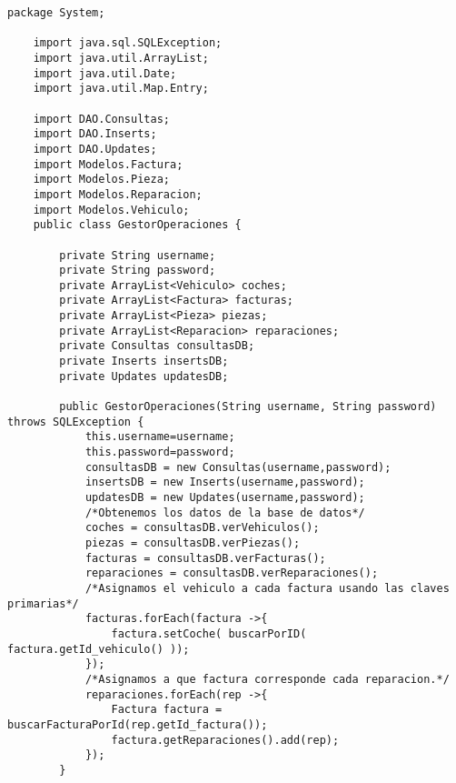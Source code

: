 


\begin{lstlisting}[caption=GestorOperaciones.java (App Escritorio)]
    package System;

    import java.sql.SQLException;
    import java.util.ArrayList;
    import java.util.Date;
    import java.util.Map.Entry;
    
    import DAO.Consultas;
    import DAO.Inserts;
    import DAO.Updates;
    import Modelos.Factura;
    import Modelos.Pieza;
    import Modelos.Reparacion;
    import Modelos.Vehiculo;
    public class GestorOperaciones {
        
        private String username;
        private String password;
        private ArrayList<Vehiculo> coches;
        private ArrayList<Factura> facturas;
        private ArrayList<Pieza> piezas;
        private ArrayList<Reparacion> reparaciones; 
        private Consultas consultasDB;
        private Inserts insertsDB;
        private Updates updatesDB;
        
        public GestorOperaciones(String username, String password) throws SQLException {
            this.username=username;
            this.password=password;
            consultasDB = new Consultas(username,password);
            insertsDB = new Inserts(username,password);
            updatesDB = new Updates(username,password);
            /*Obtenemos los datos de la base de datos*/
            coches = consultasDB.verVehiculos();
            piezas = consultasDB.verPiezas();
            facturas = consultasDB.verFacturas();
            reparaciones = consultasDB.verReparaciones();
            /*Asignamos el vehiculo a cada factura usando las claves primarias*/
            facturas.forEach(factura ->{
                factura.setCoche( buscarPorID( factura.getId_vehiculo() ));
            });
            /*Asignamos a que factura corresponde cada reparacion.*/
            reparaciones.forEach(rep ->{
                Factura factura = buscarFacturaPorId(rep.getId_factura());
                factura.getReparaciones().add(rep);
            });
        }
        

\end{lstlisting}
